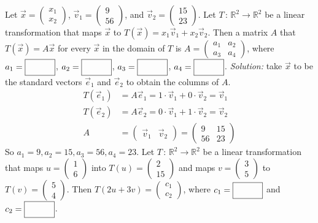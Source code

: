\fi 
\ifnum {}
    Let $\vec x = \begin{pmatrix} x_1 \\x_2\end{pmatrix}$, $\vec v_1 = \begin{pmatrix} 9\\56\end{pmatrix}$, and $\vec v_2 = \begin{pmatrix} 15\\23\end{pmatrix}$. Let $T \, : \, \mathbb R^2 \to \mathbb R^2$ be a linear transformation that maps $\vec x$ to $T(\vec x) = x_1 \vec v_1 + x_2 \vec v_2$. Then a matrix $A$ that $T(\vec x) = A\vec x$ for every $\vec x$ in the domain of $T$ is $A = \begin{pmatrix} a_1&a_2\\a_3&a_4\end{pmatrix}$, where $a_1 = \framebox{\strut\hspace{1cm}}$, $a_2 = \framebox{\strut\hspace{1cm}}$, $a_3 = \framebox{\strut\hspace{1cm}}$, $a_4 = \framebox{\strut\hspace{1cm}}$. 
    \ifnum {} {\color{DarkBlue} \textit{Solution:} take $\vec x$ to be the standard vectors $\vec e_1$ and $\vec e_2$ to obtain the columns of $A$. 
    \begin{align}
        T(\vec e_1) &= A\vec e_1 = 1\cdot \vec v_1 + 0 \cdot \vec v_2 = \vec v_1 \\
        T(\vec e_2) &= A\vec e_2 = 0\cdot \vec v_1 + 1 \cdot \vec v_2 = \vec v_2 \\
        A &= \begin{pmatrix} \vec v_1 & \vec v_2 \end{pmatrix} = \begin{pmatrix} 9&15\\56&23\end{pmatrix}
    \end{align}
    So $a_1 = 9, a_2 = 15, a_3=56, a_4=23$. 
    } \fi
\fi 
\ifnum {} %
    Let $T \, : \, \mathbb R^2 \to \mathbb R^2$ be a linear transformation that maps
    $u=\begin{pmatrix} 1\\6 \end{pmatrix}$ into $T(u) = \begin{pmatrix} 2\\15\end{pmatrix}$ and maps $v=\begin{pmatrix} 3\\5\end{pmatrix}$ to $T(v) = \begin{pmatrix} 5\\4\end{pmatrix}$. Then $T(2u+3v) = \begin{pmatrix} c_1\\c_2\end{pmatrix}$, where $c_1 = \framebox{\strut\hspace{1cm}}$ and $c_2 = \framebox{\strut\hspace{1cm}}$.  
